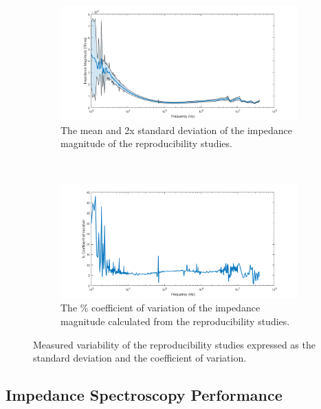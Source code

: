 \begin{figure}[h]
    \centering
    \begin{subfigure}[b]{\textwidth}
        \centering
        \includegraphics[width=\textwidth]{images/reproducibility_mean_std.png}
        \caption{The mean and 2x standard deviation of the impedance magnitude of the reproducibility studies.}
    \end{subfigure}
    \\
    \vspace{0.1 in}
    \begin{subfigure}[b]{\textwidth}
        \centering
        \includegraphics[width=\textwidth]{images/reproducibility_CV.png}
        \caption{The \% coefficient of variation of the impedance magnitude calculated from the reproducibility studies.}
    \end{subfigure}
    \caption{Measured variability of the reproducibility studies expressed as the standard deviation and the coefficient of variation.}
    \label{fig:IS_data_variation}
\end{figure}

\clearpage

\subsection{Impedance Spectroscopy Performance}



